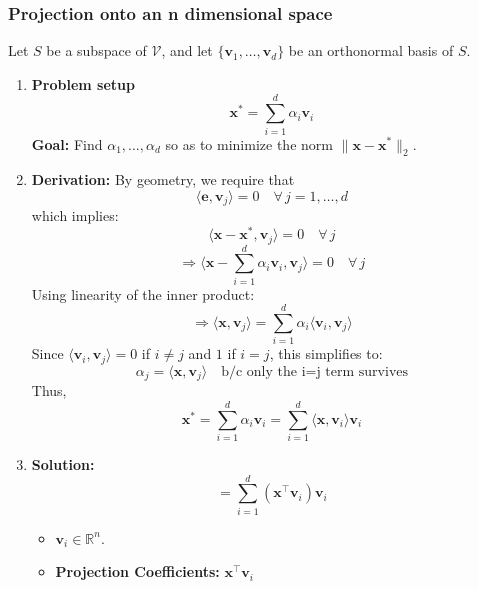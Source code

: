     \subsubsection{Projection onto an n dimensional space}
        \begin{derivation}
            Let \( S \) be a subspace of \( \mathcal{V} \), and let \( \{ \mathbf{v}_1, \dots, \mathbf{v}_d \} \) be an orthonormal basis of \( S \).
        \begin{enumerate}
            \item \textbf{Problem setup}
            \[
            \mathbf{x}^* = \sum_{i=1}^{d} \alpha_i \mathbf{v}_i
            \]
            \textbf{Goal:} Find \( \alpha_1, \dots, \alpha_d \) so as to minimize the norm \( \|\mathbf{x} - \mathbf{x}^*\|_2 \).

            \item \textbf{Derivation:}
            By geometry, we require that 
            \[
            \langle \mathbf{e}, \mathbf{v}_j \rangle = 0 \quad \forall \, j = 1, \dots, d
            \]
            which implies:
            \[
            \langle \mathbf{x} - \mathbf{x}^*, \mathbf{v}_j \rangle = 0 \quad \forall \, j
            \]
            \[
            \Rightarrow \langle \mathbf{x} - \sum_{i=1}^{d} \alpha_i \mathbf{v}_i, \mathbf{v}_j \rangle = 0 \quad \forall \, j
            \]
            Using linearity of the inner product:
            \[
            \Rightarrow \langle \mathbf{x}, \mathbf{v}_j \rangle = \sum_{i=1}^{d} \alpha_i \langle \mathbf{v}_i, \mathbf{v}_j \rangle
            \]
            Since \( \langle \mathbf{v}_i, \mathbf{v}_j \rangle = 0 \) if \( i \neq j \) and \( 1 \) if \( i = j \), this simplifies to:
            \[
            \alpha_j = \langle \mathbf{x}, \mathbf{v}_j \rangle \quad \text{b/c only the i=j term survives}
            \]
            Thus,
            \[
            \mathbf{x}^* = \sum_{i=1}^{d} \alpha_i \mathbf{v}_i = \sum_{i=1}^{d} \langle \mathbf{x}, \mathbf{v}_i \rangle \mathbf{v}_i
            \]

            \item \textbf{Solution:}
            \[
            = \sum_{i=1}^{d} (\mathbf{x}^\top \mathbf{v}_i) \mathbf{v}_i
            \]
            \begin{itemize}
                \item \( \mathbf{v}_i \in \mathbb{R}^n \).
                \item \textbf{Projection Coefficients:} $\mathbf{x}^\top \mathbf{v}_i$
            \end{itemize}


\end{enumerate}
\end{derivation}
